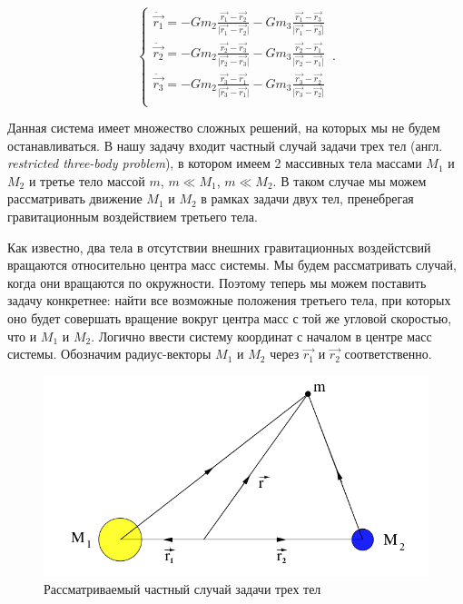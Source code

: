\documentclass[12pt]{article}
\begin{document}
    \begin{equation}
        \begin{cases}
            \ddot{\vec{r_1}} = -Gm_2\frac{\vec{r_1} - \vec{r_2}}
            {\lvert \vec{r_1} - \vec{r_2} \rvert} -
            Gm_3\frac{\vec{r_1} - \vec{r_3}}{\lvert \vec{r_1} - 
            \vec{r_3} \rvert}\\
            \ddot{\vec{r_2}} = -Gm_2\frac{\vec{r_2} - \vec{r_3}}
            {\lvert \vec{r_2} - \vec{r_3} \rvert} -
            Gm_3\frac{\vec{r_2} - \vec{r_1}}{\lvert \vec{r_2} - 
            \vec{r_1} \rvert}\\
            \ddot{\vec{r_3}} = -Gm_2\frac{\vec{r_3} - \vec{r_1}}
            {\lvert \vec{r_3} - \vec{r_1} \rvert} -
            Gm_3\frac{\vec{r_3} - \vec{r_2}}{\lvert \vec{r_3} - 
            \vec{r_2} \rvert}\\
        \end{cases}\,.
    \end{equation}

    Данная система имеет множество сложных решений, на которых мы не будем
    останавливаться. В нашу задачу входит частный случай задачи трех тел 
    (англ. \textit{restricted three-body problem}), в котором имеем
    2 массивных тела массами $M_1$ и $M_2$ и третье тело массой $m$, 
    $m \ll M_1$, $m \ll M_2$. В таком случае мы можем рассматривать движение
    $M_1$ и $M_2$ в рамках задачи двух тел, пренебрегая гравитационным
    воздействием третьего тела.
    \par Как известно, два тела в отсутствии внешних гравитационных воздейстсвий
    вращаются относительно центра масс системы. Мы будем рассматривать случай,
    когда они вращаются по окружности. Поэтому теперь мы можем
    поставить задачу конкретнее: найти все возможные положения третьего тела,
    при которых оно будет совершать вращение вокруг центра масс с той же угловой
    скоростью, что и $M_1$ и $M_2$. Логично ввести систему координат с началом в
    центре масс системы. Обозначим радиус-векторы $M_1$ и $M_2$ через $\vec{r_1}$
    и $\vec{r_2}$ соответственно.

    \begin{figure}[H]
        \centering
        \includegraphics[scale = 2]{two-bodies.png}
        \caption{Рассматриваемый частный случай задачи трех тел \cite{nasagov}}
    \end{figure}
\end{document}
